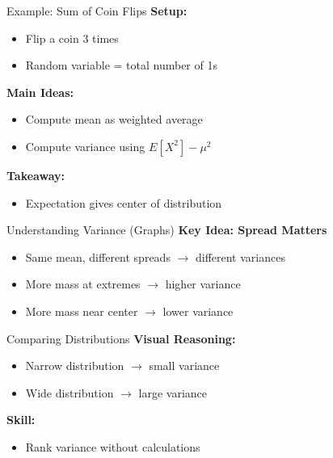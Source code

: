 \documentclass[dvipsnames]{beamer}
\begin{document}
\begin{frame}{Example: Sum of Coin Flips}
\textbf{Setup:}
\begin{itemize}
    \item Flip a coin 3 times
    \item Random variable = total number of 1s
\end{itemize}

\textbf{Main Ideas:}
\begin{itemize}
    \item Compute mean as weighted average
    \item Compute variance using $E[X^2] - \mu^2$
\end{itemize}

\textbf{Takeaway:}
\begin{itemize}
    \item Expectation gives center of distribution
\end{itemize}
\end{frame}


\begin{frame}{Understanding Variance (Graphs)}
\textbf{Key Idea: Spread Matters}

\begin{itemize}
    \item Same mean, different spreads $\rightarrow$ different variances
    \item More mass at extremes $\rightarrow$ higher variance
    \item More mass near center $\rightarrow$ lower variance
\end{itemize}
\end{frame}


\begin{frame}{Comparing Distributions}
\textbf{Visual Reasoning:}
\begin{itemize}
    \item Narrow distribution $\rightarrow$ small variance
    \item Wide distribution $\rightarrow$ large variance
\end{itemize}

\textbf{Skill:}
\begin{itemize}
    \item Rank variance without calculations
\end{itemize}
\end{frame}
\end{document}
